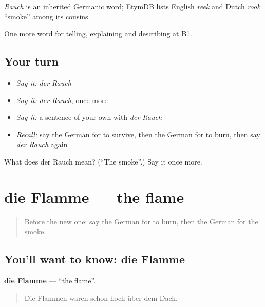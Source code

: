 \begin{cousinweb}
\emph{Rauch} is an inherited Germanic word; EtymDB lists English \emph{reek} and Dutch \emph{rook} \textquotedblleft{}smoke\textquotedblright{} among its cousins.
\end{cousinweb}

\begin{grammarlens}[title={What you've built}]
One more word for telling, explaining and describing at B1.
\end{grammarlens}

\subsection*{Your turn}
\begin{itemize}
\raggedright
  \item \emph{Say it:} \emph{der Rauch}
  \item \emph{Say it:} \emph{der Rauch}, once more
  \item \emph{Say it:} a sentence of your own with \emph{der Rauch}
  \item \emph{Recall:} say the German for to survive, then the German for to burn, then say \emph{der Rauch} again
\end{itemize}

\begin{tcolorbox}[breakable,colback=teal!4,colframe=teal!35!black,title={Before you move on}]
What does der Rauch mean? (\textquotedblleft{}The smoke\textquotedblright{}.) Say it once more.
\end{tcolorbox}
\section[die Flamme]{die Flamme — the flame}

\label{lesson:GE-C293-flamme}



\begin{quote}
Before the new one: say the German for to burn, then the German for the smoke.
\end{quote}

\subsection*{You'll want to know: die Flamme}
\textbf{die Flamme} — \textquotedblleft{}the flame\textquotedblright{}.

\begin{quote}
Die Flammen waren schon hoch über dem Dach.
\end{quote}

